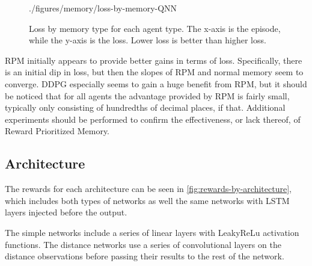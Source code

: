 \begin{figure}[!ht]
    {./figures/memory/loss-by-memory-QNN}
    \caption{
        Loss by memory type for each agent type.
        The x-axis is the episode, while the y-axis is the loss.
        Lower loss is better than higher loss.
    }
    \label{fig:loss-by-memory}
\end{figure}

RPM initially appears to provide better gains in terms of loss.
Specifically, there is an initial dip in loss, but then the slopes of RPM and normal
memory seem to converge.
DDPG especially seems to gain a huge benefit from RPM, but it should be noticed that
for all agents the advantage provided by RPM is fairly small, typically only
consisting of hundredths of decimal places, if that.
Additional experiments should be performed to confirm the effectiveness, or lack
thereof, of Reward Prioritized Memory.

\subsection{Architecture}\label{subsec:architecture}
The rewards for each architecture can be seen in
\autoref{fig:rewards-by-architecture}, which includes both types of networks as well
the same networks with LSTM layers injected before the output.

The simple networks include a series of linear layers with LeakyReLu activation
functions.
The distance networks use a series of convolutional layers on the distance
observations before passing their results to the rest of the network.

